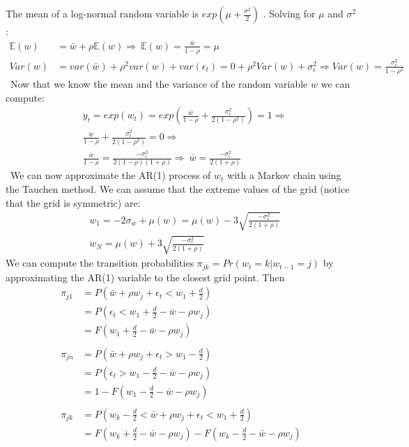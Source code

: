 \documentclass[letter,11pt]{article}
\newcommand{\bE}{{\mathbb{E}}}
\begin{document}
The mean of a log-normal random variable is $exp(\mu + \frac{\sigma^2}{2})$ . Solving for $\mu$ and $\sigma^2$:
\begin{align*}
\bE(w) &= \bar{w} + \rho \bE(w)  \Rightarrow \ \boxed{\bE(w) = \frac{ \bar{w}}{1- \rho } = \mu} \\
Var(w) &= var(\bar{w}) + \rho^2 var(w) + var(\epsilon_t) = 0 +  \rho^2 Var(w) + \sigma_{\epsilon}^2  \Rightarrow \boxed{Var(w)  = \frac{ \sigma_{\epsilon}^2}{1-\rho^2}}
\end{align*} 
\
Now that we know the mean and the variance of the random variable $w$ we can compute:
\begin{align*}
& y_t = exp(w_t) = exp \left( \frac{ \bar{w}}{1- \rho } + \frac{ \sigma_{\epsilon}^2}{2(1-\rho^2)} \right) = 1 \Rightarrow \\
& \frac{ \bar{w}}{1- \rho } + \frac{ \sigma_{\epsilon}^2}{2(1-\rho^2)}  = 0 \Rightarrow \\
&\frac{ \bar{w}}{1- \rho } = \frac{- \sigma_{\epsilon}^2}{2(1-\rho)(1+\rho)}  \Rightarrow \ \boxed{\bar{w}  = \frac{- \sigma_{\epsilon}^2}{2 (1+\rho)}}
\end{align*}
\
We can now approximate the AR(1) process of $w_t$ with a Markov chain using the Tauchen method. We can assume that the extreme values of the grid (notice that the grid is symmetric) are:
\begin{align*}
& w_1 = -2 \sigma_w + \mu(w) = \mu(w) -3 \sqrt{\frac{- \sigma_{\epsilon}^2}{2 (1+\rho)}} \\
& w_N = \mu(w) + 3 \sqrt{\frac{- \sigma_{\epsilon}^2}{2 (1+\rho)}}
\end{align*}
We can compute the transition probabilities $\pi_{jk}=Pr(w_t = k | w_{t-1} = j)$ by approximating the AR(1) variable to the closest grid point. Then
\begin{align*}
\pi_{j1}	&= P \left( \bar{w} + \rho w_j + \epsilon_t < w_1 + \frac{d}{2} \right) \\
			&= P \left(\epsilon_t < w_1 + \frac{d}{2} - \bar{w} - \rho w_j   \right) \\
			&= F \left(  w_1 + \frac{d}{2} - \bar{w} - \rho w_j  \right) \\ \\
\pi_{jn}	&= P \left( \bar{w} + \rho w_j + \epsilon_t > w_1 - \frac{d}{2} \right) \\
			&= P \left(\epsilon_t > w_1 - \frac{d}{2} - \bar{w} - \rho w_j   \right) \\
			&= 1-F \left(  w_1 - \frac{d}{2} - \bar{w} - \rho w_j   \right) \\  \\
\pi_{jk} &= P \left( w_k - \frac{d}{2} < \bar{w} + \rho w_j + \epsilon_t < w_1 + \frac{d}{2} \right) \\
			&= F \left( w_k + \frac{d}{2} - \bar{w} - \rho w_j \right)  -  F \left( w_k - \frac{d}{2} - \bar{w} - \rho w_j \right)\\
\end{align*}
\end{document}
